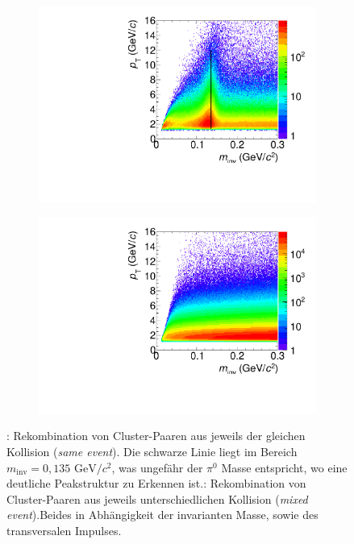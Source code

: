 \documentclass[11pt]{article}
\begin{document}
	\begin{figure}[tbp]
		\centering
		\begin{subfigure}{.5\textwidth}
			\centering
			\includegraphics[width=.95\linewidth]{hInvMass_pT_Signal.pdf}
			\caption{}
			\label{figInvMassPt_a}
		\end{subfigure}%
		\begin{subfigure}{.5\textwidth}
			\centering
			\includegraphics[width=.95\linewidth]{hInvMass_pT_Bkg.pdf}
			\caption{}
			\label{figInvMassPt_b}
		\end{subfigure}
		\caption{: Rekombination von Cluster-Paaren aus jeweils der gleichen Kollision ({\it same event}). Die schwarze Linie liegt im Bereich $m_{\text{inv}}=0,135\text{ GeV/}c^{2}$, was ungef{\"a}hr der $\pi^{0}$ Masse entspricht, wo eine deutliche Peakstruktur zu Erkennen ist.: Rekombination von Cluster-Paaren aus jeweils unterschiedlichen Kollision ({\it mixed event}).\newline Beides in Abh{\"a}ngigkeit der invarianten Masse, sowie des transversalen Impulses.}
		\label{figInvMassPt}
	\end{figure}
\end{document}
